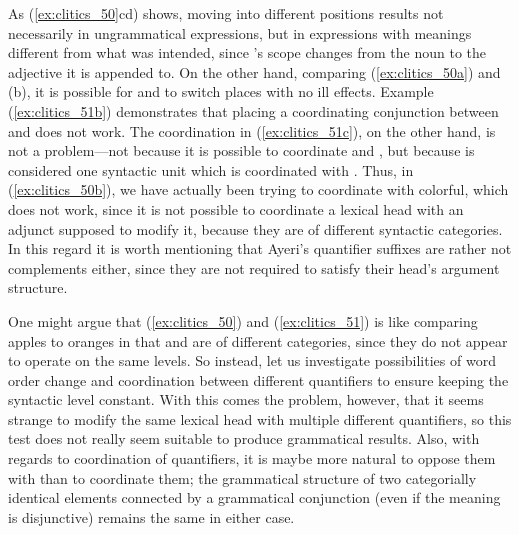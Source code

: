 As (\ref{ex:clitics_50}cd) shows, moving 
into different positions results not necessarily in ungrammatical expressions,
but in expressions with meanings different from what was intended, since
's scope changes from the noun to the adjective it is
appended to. On the other hand, comparing (\ref{ex:clitics_50a}) and (b), it is
possible for  and  to
switch places with no ill effects. Example (\ref{ex:clitics_51b}) demonstrates
that placing a coordinating conjunction between  and
 does not work. The coordination in (\ref{ex:clitics_51c}), on
the other hand, is not a problem---not because it is possible to coordinate
 and , but because
 is considered one syntactic unit
which is coordinated with . Thus, in
(\ref{ex:clitics_50b}), we have actually been trying to coordinate
 with 
{colorful}, which does not work, since it is not possible to coordinate a
lexical head with an adjunct supposed to modify it, because they are of
different syntactic categories. In this regard it is worth mentioning that
Ayeri's quantifier suffixes are rather not complements either, since they are
not required to satisfy their head's argument structure.

One might argue that (\ref{ex:clitics_50}) and (\ref{ex:clitics_51}) is like
comparing apples to oranges in that  and
 are of different categories, since they do not
appear to operate on the same levels. So instead, let us investigate
possibilities of word order change and coordination between different
quantifiers to ensure keeping the syntactic level constant. With this comes the
problem, however, that it seems strange to modify the same lexical head with
multiple different quantifiers, so this test does not really seem suitable to
produce grammatical results. Also, with regards to coordination of quantifiers,
it is maybe more natural to oppose them with  than to
coordinate them; the grammatical structure of two categorially identical
elements connected by a grammatical conjunction (even if the meaning is
disjunctive) remains the same in either case.

